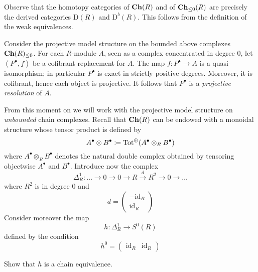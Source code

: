 \begin{refsection}
\begin{rmk}
Observe that the homotopy categories of $\mathbf{Ch}(R)$ and of $\mathbf{Ch}_{\le 0}(R)$ are precisely the derived categories $\mathrm{D}(R)$ and $\mathrm{D}^b(R)$. This follows from the definition of the weak equivalences.
\end{rmk}

\begin{eg}
Consider the projective model structure on the bounded above complexes $\mathbf{Ch}(R)_{\le 0}$. For each $R$-module $A$, seen as a complex concentrated in degree $0$, let $(P^\bullet,f)$ be a cofibrant replacement for $A$. The map $f \colon P^\bullet \to A$ is a quasi-isomorphism; in particular $P^\bullet$ is exact in strictly positive degrees. Moreover, it is cofibrant, hence each object is projective. It follows that $P^\bullet$ is a \emph{projective resolution} of $A$.
\end{eg}

From this moment on we will work with the projective model structure on \emph{unbounded} chain complexes. Recall that $\mathbf{Ch}(R)$ can be endowed with a monoidal structure whose tensor product is defined by
\[
A^\bullet \otimes B^\bullet \coloneqq \operatorname{\mathrm{Tot}}^\oplus(A^\bullet \otimes_R B^\bullet)
\]
where $A^\bullet \otimes_R B^\bullet$ denotes the natural double complex obtained by tensoring objectwise $A^\bullet$ and $B^\bullet$. Introduce now the complex
\[
\Delta^1_R \colon \ldots \to 0 \to 0 \to R \xrightarrow{d} R^2 \to 0 \to \ldots
\]
where $R^2$ is in degree $0$ and
\[
d = \begin{pmatrix} - \mathrm{id}_R \\ \mathrm{id}_R \end{pmatrix}
\]
Consider moreover the map
\begin{equation} \label{eq cylinder chain complex}
h \colon \Delta^1_R \to S^0(R)
\end{equation}
defined by the condition
\[
h^0 = \begin{pmatrix} \mathrm{id}_R & \mathrm{id}_R \end{pmatrix}
\]

\begin{exercise}
Show that $h$ is a chain equivalence.
\end{exercise}


\end{refsection}
